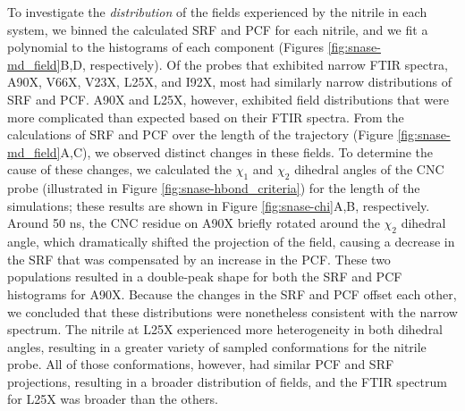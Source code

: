 To investigate the \emph{distribution} of the fields experienced by the nitrile in each system, we binned the calculated SRF and PCF for each nitrile, and we fit a polynomial to the histograms of each component (Figures \ref{fig:snase-md_field}B,D, respectively). 
Of the probes that exhibited narrow FTIR spectra, A90X, V66X, V23X, L25X, and I92X, most had similarly narrow distributions of SRF and PCF.  
A90X and L25X, however, exhibited field distributions that were more complicated than expected based on their FTIR spectra. 
From the calculations of SRF and PCF over the length of the trajectory (Figure \ref{fig:snase-md_field}A,C), we observed distinct changes in these fields. 
To determine the cause of these changes, we calculated the $\chi_1$ and $\chi_2$ dihedral angles of the CNC probe (illustrated in Figure \ref{fig:snase-hbond_criteria}) for the length of the simulations; 
these results are shown in Figure \ref{fig:snase-chi}A,B, respectively. 
Around 50 ns, the CNC residue on A90X briefly rotated around the $\chi_2$ dihedral angle, which dramatically shifted the projection of the field, causing a decrease in the SRF that was compensated by an increase in the PCF. 
These two populations resulted in a double-peak shape for both the SRF and PCF histograms for A90X. 
Because the changes in the SRF and PCF offset each other, we concluded that these distributions were nonetheless consistent with the narrow spectrum. 
The nitrile at L25X experienced more heterogeneity in both dihedral angles, resulting in a greater variety of sampled conformations for the nitrile probe. 
All of those conformations, however, had similar PCF and SRF projections, resulting in a broader distribution of fields, and the FTIR spectrum for L25X was broader than the others.

